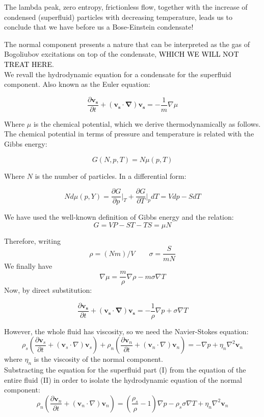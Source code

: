\documentclass{article}
\newcommand{\black}{\textcolor{black}}
\begin{document}
The lambda peak, zero entropy, frictionless flow, together with the increase of condensed (superfluid) particles with decreasing temperature, leads us to conclude that we have before us a Bose-Einstein condensate!

The normal component presents a nature that can be interpreted as the gas of Bogoliubov excitations on top of the condensate, \black{WHICH WE WILL NOT TREAT HERE}.
\\

We revall the hydrodynamic equation for a condensate for the superfluid component. Also known as the Euler equation: 

\[\frac{\partial \mathbf{v_s}}{\partial t} + (\mathbf{v_s}\cdot \mathbf{\nabla})\mathbf{v_s} = -\frac{1}{m}\nabla \mu\]

Where $\mu$ is the chemical potential, which we derive thermodynamically as follows. The chemical potential in terms of pressure and temperature is related with the Gibbs energy:

\[G(N, p, T)= N \mu(p, T)\]

Where $N$ is the number of particles. In a differential form:

\[N d\mu(p, Y) = \frac{\partial G}{\partial p} \bigg|_T + \frac{\partial G}{\partial T}\bigg|_pdT = Vdp - S dT\]

We have used the well-known definition of Gibbs energy and the relation:
\[G = VP - ST - TS = \mu N\]

Therefore, writing 
\[\rho = (Nm)/V \qquad \sigma = \frac{S}{mN}\]
We finally have
\[\nabla \mu = \frac{m}{\rho} \nabla \rho - m \sigma \nabla T\]
Now, by direct substitution:

\[\frac{\partial \mathbf{v_s}}{\partial t} + (\mathbf{v_s}\cdot \mathbf{\nabla})\mathbf{v_s} = -\frac{1}{\rho}\nabla p + \sigma \nabla T \tag{I}\]

However, the whole fluid has viscosity, so we need the Navier-Stokes equation:
\[
\rho_s \left( \frac{\partial \mathbf{v}_s}{\partial t} + (\mathbf{v}_s \cdot \nabla) \mathbf{v}_s \right) + \rho_n \left( \frac{\partial \mathbf{v}_n}{\partial t} + (\mathbf{v}_n \cdot \nabla) \mathbf{v}_n \right) = -\nabla p + \eta_n \nabla^2 \mathbf{v}_n \tag{II}
\]
where $\eta_n$ is the viscosity of the normal component.
\\

Substracting the equation for the superfluid part (I) from the equation of the entire fluid (II) in order to isolate the hydrodynamic equation of the normal component:
\[
\rho_n \left( \frac{\partial \mathbf{v}_n}{\partial t} + (\mathbf{v}_n \cdot \nabla) \mathbf{v}_n \right) = \left( \frac{\rho_s}{\rho} - 1 \right) \nabla p - \rho_s \sigma \nabla T + \eta_n \nabla^2 \mathbf{v}_n \]
\end{document}
